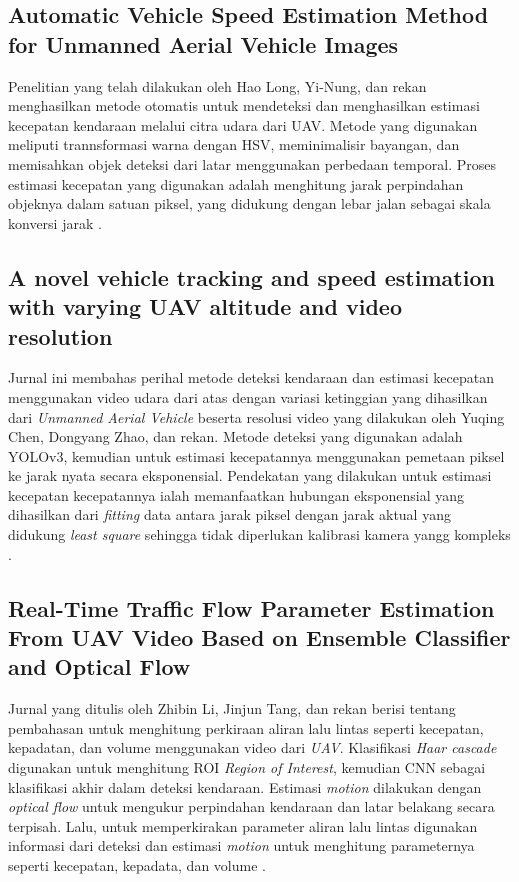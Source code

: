\subsection{Automatic Vehicle Speed Estimation Method for Unmanned Aerial Vehicle Images}
Penelitian yang telah dilakukan oleh Hao Long, Yi-Nung, dan rekan menghasilkan metode otomatis untuk mendeteksi dan menghasilkan estimasi kecepatan kendaraan melalui citra udara dari UAV. Metode yang digunakan meliputi trannsformasi warna dengan HSV, meminimalisir bayangan, dan memisahkan objek deteksi dari latar menggunakan perbedaan temporal. Proses estimasi kecepatan yang digunakan adalah menghitung jarak perpindahan objeknya dalam satuan piksel, yang didukung dengan lebar jalan sebagai skala konversi jarak \cite{auto-vehicle-speed-uav-img}.

\subsection{A novel vehicle tracking and speed estimation with varying UAV altitude and video resolution}
Jurnal ini membahas perihal metode deteksi kendaraan dan estimasi kecepatan menggunakan video udara dari atas dengan variasi ketinggian yang dihasilkan dari \emph{Unmanned Aerial Vehicle} beserta resolusi video yang dilakukan oleh Yuqing Chen, Dongyang Zhao, dan rekan. Metode deteksi yang digunakan adalah YOLOv3, kemudian untuk estimasi kecepatannya menggunakan pemetaan piksel ke jarak nyata secara eksponensial. Pendekatan yang dilakukan untuk estimasi kecepatan kecepatannya ialah memanfaatkan hubungan eksponensial yang dihasilkan dari \emph{fitting} data antara jarak piksel dengan jarak aktual yang didukung \emph{least square} sehingga tidak diperlukan kalibrasi kamera yangg kompleks \cite{novel-vehicle-tracking}.

\subsection{Real-Time Traffic Flow Parameter Estimation From UAV Video Based on Ensemble Classifier and Optical Flow}
Jurnal yang ditulis oleh Zhibin Li, Jinjun Tang, dan rekan berisi tentang pembahasan untuk menghitung perkiraan aliran lalu lintas seperti kecepatan, kepadatan, dan volume menggunakan video dari \emph{UAV}. Klasifikasi \emph{Haar cascade} digunakan untuk menghitung ROI \emph{Region of Interest}, kemudian CNN sebagai klasifikasi akhir dalam deteksi kendaraan. Estimasi \emph{motion} dilakukan dengan \emph{optical flow} untuk mengukur perpindahan kendaraan dan latar belakang secara terpisah. Lalu, untuk memperkirakan parameter aliran lalu lintas digunakan informasi dari deteksi dan estimasi \emph{motion} untuk menghitung parameternya seperti kecepatan, kepadata, dan volume \cite{realtime-trafficflow-estimation}.

